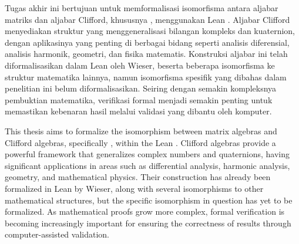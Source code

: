 \begin{Abstrak}

Tugas akhir ini bertujuan untuk memformalisasi isomorfisma antara aljabar matriks dan aljabar Clifford, khususnya \icm{}, menggunakan Lean \thpr{}. Aljabar Clifford menyediakan struktur yang menggeneralisasi bilangan kompleks dan kuaternion, dengan aplikasinya yang penting di berbagai bidang seperti analisis diferensial, analisis harmonik, geometri, dan fisika matematis. Konstruksi aljabar ini telah diformalisasikan dalam Lean oleh Wieser, beserta beberapa isomorfisma ke struktur matematika lainnya, namun isomorfisma spesifik yang dibahas dalam penelitian ini belum diformalisasikan. Seiring dengan semakin kompleksnya pembuktian matematika, verifikasi formal menjadi semakin penting untuk memastikan kebenaran hasil melalui validasi yang dibantu oleh komputer.


\end{Abstrak}

\begin{Abstract}

This thesis aims to formalize the isomorphism between matrix algebras and Clifford algebras, specifically \icm{}, within the Lean \thpr{}. Clifford algebras provide a powerful framework that generalizes complex numbers and quaternions, having significant applications in areas such as differential analysis, harmonic analysis, geometry, and mathematical physics. Their construction has already been formalized in Lean by Wieser, along with several isomorphisms to other mathematical structures, but the specific isomorphism in question has yet to be formalized. As mathematical proofs grow more complex, formal verification is becoming increasingly important for ensuring the correctness of results through computer-assisted validation.

\end{Abstract}